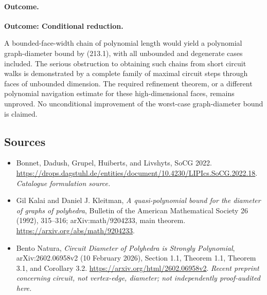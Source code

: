 \documentclass[11pt,a4paper]{article}
\begin{document}
\paragraph{Outcome.}
\textbf{Outcome: Conditional reduction.}

A bounded-face-width chain of polynomial length would yield a polynomial
graph-diameter bound by (213.1), with all unbounded and degenerate cases
included. The serious obstruction to obtaining such chains from short
circuit walks is demonstrated by a complete family of maximal circuit steps
through faces of unbounded dimension. The required refinement theorem, or
a different polynomial navigation estimate for these high-dimensional
faces, remains unproved. No unconditional improvement of the worst-case
graph-diameter bound is claimed.
\subsection{Sources}
\begin{itemize}\raggedright
\item[\textnormal{[S1]}]\hypertarget{source:213:1}{} Bonnet, Dadush, Grupel, Huiberts, and Livshyts, SoCG 2022.
\url{https://drops.dagstuhl.de/entities/document/10.4230/LIPIcs.SoCG.2022.18}.
{\small\textit{Catalogue formulation source.}}
\item[\textnormal{[E1]}]\hypertarget{extra:213:1}{} Gil Kalai and Daniel J. Kleitman,
\emph{A quasi-polynomial bound for the diameter of graphs of polyhedra},
Bulletin of the American Mathematical Society 26 (1992), 315--316;
arXiv:math/9204233, main theorem.
\url{https://arxiv.org/abs/math/9204233}.
\item[\textnormal{[E2]}]\hypertarget{extra:213:2}{} Bento Natura,
\emph{Circuit Diameter of Polyhedra is Strongly Polynomial},
arXiv:2602.06958v2 (10 February 2026), Section 1.1, Theorem 1.1,
Theorem 3.1, and Corollary 3.2.
\url{https://arxiv.org/html/2602.06958v2}.
{\small\textit{Recent preprint concerning circuit, not vertex-edge, diameter; not independently proof-audited here.}}
\end{itemize}
\end{document}
